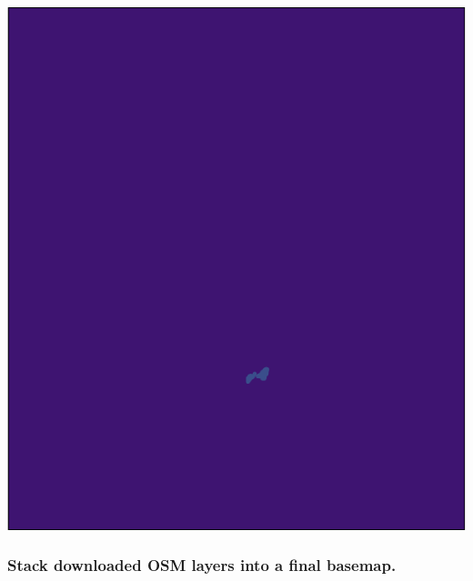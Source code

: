 \documentclass[
  paper=a4,
  ,captions=tableheading
]{scrartcl}
\begin{document}
\includegraphics{Haskell_files/figure-latex/unnamed-chunk-26-1.pdf}

\hypertarget{stack-downloaded-osm-layers-into-a-final-basemap.}{%
\subsubsection{Stack downloaded OSM layers into a final
basemap.}\label{stack-downloaded-osm-layers-into-a-final-basemap.}}
\end{document}
